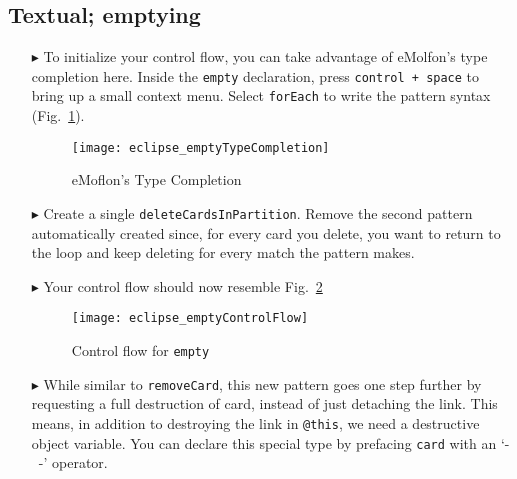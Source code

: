 \newpage
\subsection{Textual; emptying}
\texHeader
\hypertarget{emptyPartition tex}{}

\texttt{}
\emph{}

\begin{itemize}
 
\item[$\blacktriangleright$] To initialize your control flow, you can take advantage of eMolfon's type completion here. Inside the \texttt{empty}
declaration, press  \texttt{control + space} to bring up a small context menu. Select \texttt{forEach} to write the pattern syntax
(Fig.~\ref{fig:typeCompletion}).

\vspace{0.5cm}

\begin{figure}[htpb]
\begin{center}
  \texttt{[image: eclipse\_emptyTypeCompletion]}
  \caption{eMoflon's Type Completion}
  \label{fig:typeCompletion}
\end{center}
\end{figure}

\vspace{0.5cm}

\item[$\blacktriangleright$] Create a single \texttt{deleteCardsInPartition}. Remove the second pattern automatically created since, for every card you delete,
you want to return to the loop and keep deleting for every match the pattern makes.

\vspace{0.5cm}

\item[$\blacktriangleright$] Your control flow should now resemble Fig.~\ref{fig:emptyControlFlow}

\clearpage

\begin{figure}[htpb]
\begin{center}
  \texttt{[image: eclipse\_emptyControlFlow]}
  \caption{Control flow for \texttt{empty}}
  \label{fig:emptyControlFlow}
\end{center}
\end{figure}

\item[$\blacktriangleright$] While similar to \texttt{removeCard}, this new pattern goes one step further by requesting a full destruction of card, instead of
just detaching the link. This means, in addition to destroying the link in \texttt{@this}, we need a destructive object variable. You can declare this special
type by prefacing \texttt{card} with an `-~-' operator.


\end{itemize}
